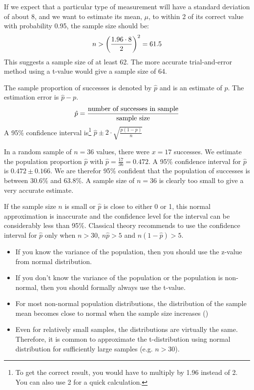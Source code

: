 \begin{example}
    If we expect that a particular type of measurement will have a standard deviation of about 8, and we want to estimate its mean, $\mu$, to within 2 of its correct value with probability 0.95, the sample size should be:
    \begin{align}
        n>\left(\frac{1.96\cdot 8}{2}\right)^2 = 61.5\notag
    \end{align}
    This suggests a sample size of at least 62. The more accurate trial-and-error method using a t-value would give a sample size of 64.
\end{example}

The sample proportion of successes is denoted by $\hat{p}$ and is an estimate of $p$. The estimation error is $\hat{p}-p$.
\begin{align}
    \hat{p} = \frac{\text{number of successes in sample}}{\text{sample size}} \notag
\end{align}
A 95\% confidence interval is\footnote{To get the correct result, you would have to multiply by 1.96 instead of 2. You can also use 2 for a quick calculation.} $\hat{p} \pm 2\cdot\sqrt{\frac{p(1-p)}{n}}$

\begin{example}
    In a random sample of $n=36$ values, there were $x=17$ successes. We estimate the population proportion $\hat{p}$ with $\hat{p}=\frac{17}{36}=0.472$. A 95\% confidence interval for $\hat{p}$ is $0.472\pm 0.166$. We are therefor 95\% confident that the population of successes is between 30.6\% and 63.8\%. A sample size of $n=36$ is clearly too small to give a very accurate estimate.
    
    If the sample  size $n$ is small or $\hat{p}$ is close to either 0 or 1, this normal approximation is inaccurate and the confidence level for the interval can be considerably less than 95\%. Classical theory recommends to use the confidence interval for $\hat{p}$ only when $n>30$, $n\hat{p}>5$ and $n(1-\hat{p})>5$.
\end{example}

\begin{*anmerkung}
    \begin{itemize}
        \item If you know the variance of the population, then you should use the z-value from normal distribution.
        \item If you don't know the variance of the population or the population is non-normal, then you should formally always use the t-value.
        \item For most non-normal population distributions, the distribution of the sample mean becomes close to normal when the sample size increases ()
        \item Even for relatively small samples, the distributions are virtually the same. Therefore, it is common to approximate the t-distribution using normal distribution for sufficiently large samples (e.g. $n>30$).
    \end{itemize}
\end{*anmerkung}

